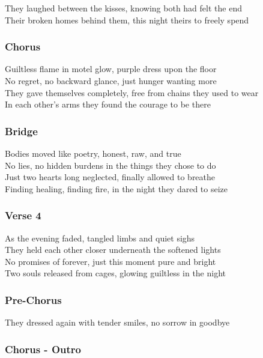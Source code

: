 They laughed between the kisses, knowing both had felt the end\\
Their broken homes behind them, this night theirs to freely spend

\subsubsection{Chorus}\label{chorus-78}

Guiltless flame in motel glow, purple dress upon the floor\\
No regret, no backward glance, just hunger wanting more\\
They gave themselves completely, free from chains they used to wear\\
In each other's arms they found the courage to be there

\subsubsection{Bridge}\label{bridge-28}

Bodies moved like poetry, honest, raw, and true\\
No lies, no hidden burdens in the things they chose to do\\
Just two hearts long neglected, finally allowed to breathe\\
Finding healing, finding fire, in the night they dared to seize

\subsubsection{Verse 4}\label{verse-4-9}

As the evening faded, tangled limbs and quiet sighs\\
They held each other closer underneath the softened lights\\
No promises of forever, just this moment pure and bright\\
Two souls released from cages, glowing guiltless in the night

\subsubsection{Pre-Chorus}\label{pre-chorus-57}

They dressed again with tender smiles, no sorrow in goodbye

\subsubsection{Chorus - Outro}\label{chorus---outro-5}

